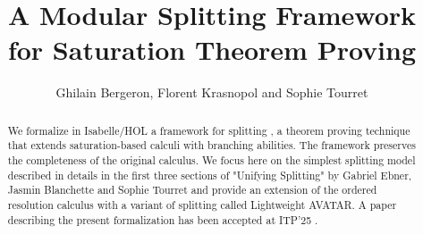 \documentclass[11pt,a4paper]{article}
\begin{document}
\title{A Modular Splitting Framework for Saturation Theorem Proving}
\author{Ghilain Bergeron, Florent Krasnopol and Sophie Tourret}
\maketitle
\begin{abstract}
  We formalize in Isabelle/HOL a framework for splitting \cite{EbnerBT21}, a theorem proving technique that extends saturation-based calculi with branching abilities. 
  The framework preserves the completeness of the original calculus.
  We focus here on the simplest splitting model described in details in the first three sections of "Unifying Splitting" by Gabriel Ebner, Jasmin Blanchette and Sophie Tourret \cite{EbnerBT23} and provide an extension of the ordered resolution calculus with a variant of splitting called Lightweight AVATAR.
  A paper describing the present formalization has been accepted at ITP'25 \cite{BergeronKT25}.
\end{abstract}
\tableofcontents



\end{document}
